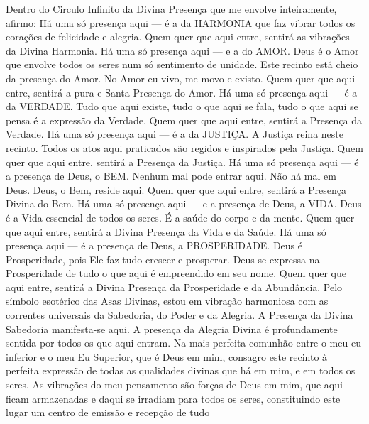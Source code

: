   \beginverse
    Dentro do Circulo Infinito da Divina Presença que
    me envolve inteiramente, afirmo:
    \parspace
    Há uma só presença aqui --- é a da HARMONIA que faz
    vibrar todos os corações de felicidade e alegria.
    Quem quer que aqui entre, sentirá as vibrações da
    Divina Harmonia.
    \parspace
    Há uma só presença aqui --- e a do AMOR. Deus é o
    Amor que envolve todos os seres num só sentimento
    de unidade. Este recinto está cheio da presença do
    Amor. No Amor eu vivo, me movo e existo. Quem quer
    que aqui entre, sentirá a pura e Santa Presença do
    Amor.
    \parspace
    Há uma só presença aqui --- é a da VERDADE. Tudo
    que aqui existe, tudo o que aqui se fala, tudo o
    que aqui se pensa é a expressão da Verdade. Quem
    quer que aqui entre, sentirá a Presença da Verdade.
    \parspace
    Há uma só presença aqui --- é a da JUSTIÇA.
    A Justiça reina neste recinto. Todos os atos aqui
    praticados são regidos e inspirados pela Justiça.
    Quem quer que aqui entre, sentirá
    a Presença da Justiça.
    \parspace
    Há uma só presença aqui --- é a presença de Deus,
    o BEM. Nenhum mal pode entrar aqui. Não há mal em
    Deus. Deus, o Bem, reside aqui. Quem quer que aqui
    entre, sentirá a Presença Divina do Bem.
    \parspace
    Há uma só presença aqui --- e a presença de Deus,
    a VIDA. Deus é a Vida essencial de todos os seres.
    É a saúde do corpo e da mente. Quem quer que aqui
    entre, sentirá a Divina Presença da Vida e da Saúde.
    \parspace
    Há uma só presença aqui --- é a presença de Deus,
    a PROSPERIDADE. Deus é Prosperidade, pois Ele faz
    tudo crescer e prosperar. Deus se expressa na
    Prosperidade de tudo o que aqui é empreendido em
    seu nome. Quem quer que aqui entre, sentirá
    a Divina Presença da Prosperidade e da Abundância.
    \parspace
    Pelo símbolo esotérico das Asas Divinas, estou
    em vibração harmoniosa com as correntes universais
    da Sabedoria, do Poder e da Alegria. A Presença
    da Divina Sabedoria manifesta-se aqui. A presença
    da Alegria Divina é profundamente sentida por todos
    os que aqui entram.
    \parspace
    Na mais perfeita comunhão entre o meu eu inferior
    e o meu Eu Superior, que é Deus em mim, consagro
    este recinto à perfeita expressão de todas as
    qualidades divinas que há em mim, e em todos os
    seres.
    \parspace
    As vibrações do meu pensamento são forças de Deus
    em mim, que aqui ficam armazenadas e daqui se
    irradiam para todos os seres, constituindo este
    lugar um centro de emissão e recepção de tudo
